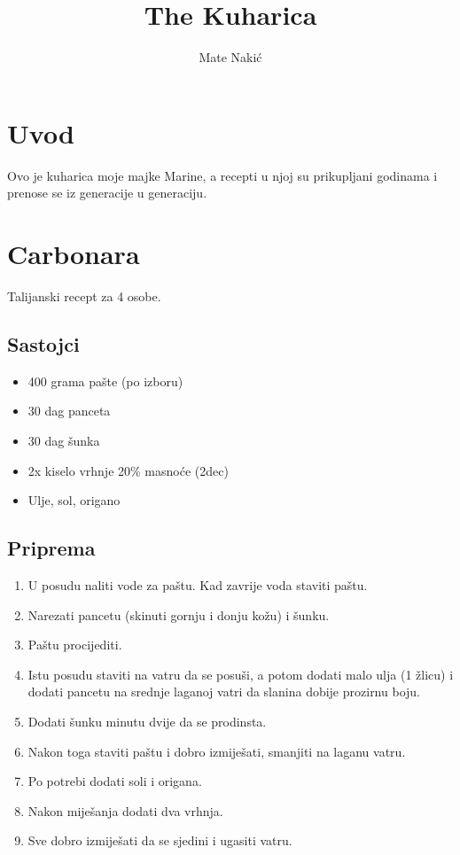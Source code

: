 \documentclass{article}
\title{The Kuharica}
\author{Mate Nakić}
\begin{document}
\maketitle

\newpage

\section{Uvod}
Ovo je kuharica moje majke Marine, a recepti u njoj su prikupljani godinama
i prenose se iz generacije u generaciju.

\section{Carbonara}
Talijanski recept za 4 osobe.
\subsection{Sastojci}
\begin{itemize}
  \item 400 grama pašte (po izboru)
  \item 30 dag panceta
  \item 30 dag šunka
  \item 2x kiselo vrhnje 20\% masnoće (2dec)
  \item Ulje, sol, origano
\end{itemize}

\subsection{Priprema}
\begin{enumerate}
  \item U posudu naliti vode za paštu. Kad zavrije voda staviti paštu.
  \item Narezati pancetu (skinuti gornju i donju kožu) i šunku.
  \item Paštu procijediti.
  \item Istu posudu staviti na vatru da se posuši, a potom dodati malo ulja (1 žlicu) i dodati pancetu na srednje laganoj vatri da slanina dobije prozirnu boju.
  \item Dodati šunku minutu dvije da se prodinsta.
  \item Nakon toga staviti paštu i dobro izmiješati, smanjiti na laganu vatru.
  \item Po potrebi dodati soli i origana.
  \item Nakon miješanja dodati dva vrhnja.
  \item Sve dobro izmiješati da se sjedini i ugasiti vatru.
\end{enumerate}
\end{document}
